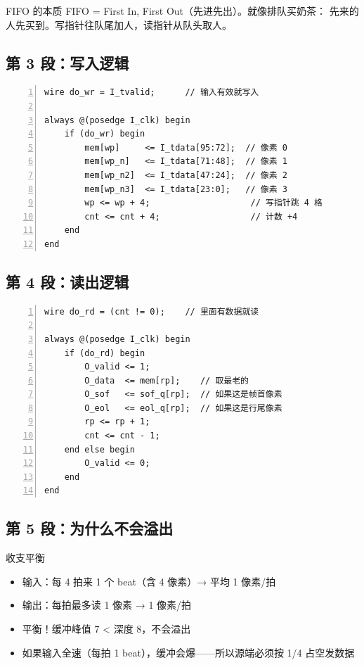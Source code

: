 \documentclass[11pt]{ctexart}
\begin{document}
\begin{keybox}{FIFO 的本质}
FIFO = First In, First Out（先进先出）。就像排队买奶茶：
先来的人先买到。写指针往队尾加人，读指针从队头取人。
\end{keybox}

\subsection{第 3 段：写入逻辑}

\begin{Verbatim}[frame=single,fontsize=\small,numbers=left]
wire do_wr = I_tvalid;      // 输入有效就写入

always @(posedge I_clk) begin
    if (do_wr) begin
        mem[wp]     <= I_tdata[95:72];  // 像素 0
        mem[wp_n]   <= I_tdata[71:48];  // 像素 1
        mem[wp_n2]  <= I_tdata[47:24];  // 像素 2
        mem[wp_n3]  <= I_tdata[23:0];   // 像素 3
        wp <= wp + 4;                    // 写指针跳 4 格
        cnt <= cnt + 4;                  // 计数 +4
    end
end
\end{Verbatim}

\subsection{第 4 段：读出逻辑}

\begin{Verbatim}[frame=single,fontsize=\small,numbers=left]
wire do_rd = (cnt != 0);    // 里面有数据就读

always @(posedge I_clk) begin
    if (do_rd) begin
        O_valid <= 1;
        O_data  <= mem[rp];    // 取最老的
        O_sof   <= sof_q[rp];  // 如果这是帧首像素
        O_eol   <= eol_q[rp];  // 如果这是行尾像素
        rp <= rp + 1;
        cnt <= cnt - 1;
    end else begin
        O_valid <= 0;
    end
end
\end{Verbatim}

\subsection{第 5 段：为什么不会溢出}

\begin{keybox}{收支平衡}
\begin{itemize}
  \item 输入：每 4 拍来 1 个 beat（含 4 像素）→ 平均 1 像素/拍
  \item 输出：每拍最多读 1 像素 → 1 像素/拍
  \item 平衡！缓冲峰值 7 < 深度 8，不会溢出
  \item 如果输入全速（每拍 1 beat），缓冲会爆——所以源端必须按 1/4 占空发数据
\end{itemize}
\end{keybox}
\end{document}
